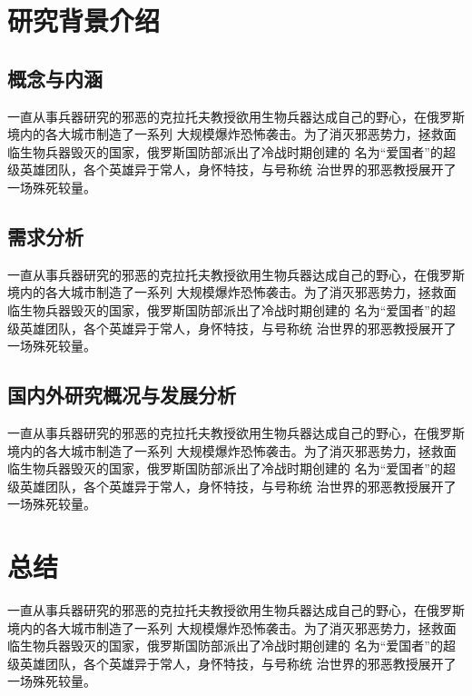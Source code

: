 \documentclass{icsartcn}
\begin{document}

\section{研究背景介绍}
\subsection{概念与内涵}
一直从事兵器研究的邪恶的克拉托夫教授欲用生物兵器达成自己的野心，在俄罗斯境内的各大城市制造了一系列
大规模爆炸恐怖袭击。为了消灭邪恶势力，拯救面临生物兵器毁灭的国家，俄罗斯国防部派出了冷战时期创建的
名为“爱国者”的超级英雄团队，各个英雄异于常人，身怀特技，与号称统 治世界的邪恶教授展开了一场殊死较量。


\subsection{需求分析}

一直从事兵器研究的邪恶的克拉托夫教授欲用生物兵器达成自己的野心，在俄罗斯境内的各大城市制造了一系列
大规模爆炸恐怖袭击。为了消灭邪恶势力，拯救面临生物兵器毁灭的国家，俄罗斯国防部派出了冷战时期创建的
名为“爱国者”的超级英雄团队，各个英雄异于常人，身怀特技，与号称统 治世界的邪恶教授展开了一场殊死较量。


\subsection{国内外研究概况与发展分析}

一直从事兵器研究的邪恶的克拉托夫教授欲用生物兵器达成自己的野心\cite{kandukuri2009cloud}，在俄罗斯境内的各大城市制造了一系列
大规模爆炸恐怖袭击。为了消灭邪恶势力，拯救面临生物兵器毁灭的国家，俄罗斯国防部派出了冷战时期创建的
名为“爱国者”的超级英雄团队，各个英雄异于常人，身怀特技，与号称统 治世界的邪恶教授展开了一场殊死较量。

\section{总结}
一直从事兵器研究的邪恶的克拉托夫教授欲用生物兵器达成自己的野心，在俄罗斯境内的各大城市制造了一系列
大规模爆炸恐怖袭击。为了消灭邪恶势力，拯救面临生物兵器毁灭的国家，俄罗斯国防部派出了冷战时期创建的
名为“爱国者”的超级英雄团队，各个英雄异于常人，身怀特技，与号称统 治世界的邪恶教授展开了一场殊死较量。



\appendix


\printindex{}
\backmatter
\end{document}
